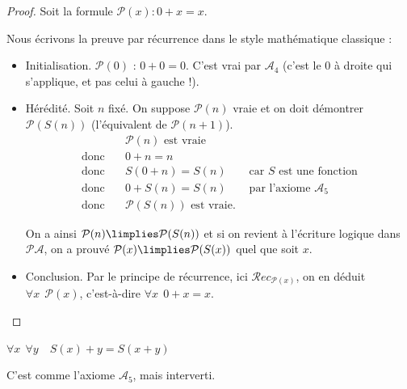 \documentclass[11pt,class=report,crop=false]{standalone}
\begin{document}
\begin{proof}
Soit la formule $\mathcal{P}(x) : 0+x=x$.

Nous écrivons la preuve par récurrence dans le style mathématique classique :
\begin{itemize}
	\item Initialisation. $\mathcal{P}(0)$ : $0+0=0$. C'est vrai par $\mathcal{A}_4$ (c'est le $0$ à droite qui s'applique, et pas celui à gauche !).
	
	\item Hérédité. Soit $n$ fixé. On suppose $\mathcal{P}(n)$ vraie et on doit démontrer $\mathcal{P}(S(n))$ (l'équivalent de $\mathcal{P}(n+1)$).
	\begin{align*}
		& \mathcal{P}(n) \text{ est vraie} \\
		\text{donc} \quad & 0+n=n  \\
		\text{donc} \quad & S(0+n)=S(n) \qquad \text{car $S$ est une fonction} \\
		\text{donc} \quad & 0+S(n)=S(n) \qquad \text{par l'axiome } \mathcal{A}_5 \\
		\text{donc} \quad & \mathcal{P}(S(n)) \text{ est vraie.}  
	\end{align*}


On a ainsi $\mathcal{P}(n) \limplies \mathcal{P}(S(n))$ et si on revient à l'écriture logique dans $\mathcal{PA}$, on a prouvé $\mathcal{P}(x) \limplies \mathcal{P}(S(x))$ quel que soit $x$.

   \item Conclusion. Par le principe de récurrence, ici $\mathcal{R}ec_{\mathcal{P}(x)}$, on en déduit \og{}$\forall x \ \ \mathcal{P}(x)$\fg{}, c'est-à-dire \og{}$\forall x \ \ 0+x=x$\fg{}.
 \end{itemize}
\end{proof}



\begin{lemme}
	\label{lem:peano2}
	$\forall x \ \ \forall y \quad S(x)+y=S(x+y)$
\end{lemme}

C'est comme l'axiome $\mathcal{A}_5$, mais interverti.
\end{document}
